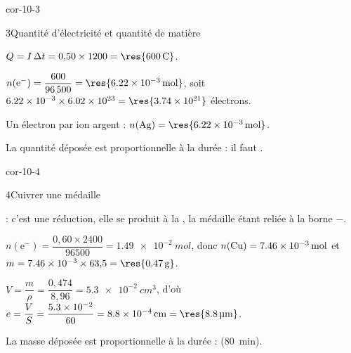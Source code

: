 \begin{blocLivre}{cor-10-3}
\begin{corrige}{3}{Quantité d'électricité et quantité de matière}
\begin{questions}
\item $Q=I\,\Delta t=0{,}50\times1200=\res{\qty{600}{C}}$.
\item $n(\mathrm{e}^-)=\dfrac{600}{\num{96500}}=\res{\qty{6,22e-3}{mol}}$, soit
$\num{6.22e-3}\times\num{6.02e23}=\res{\num{3,74e21}}$ électrons.
\item Un électron par ion argent : $n(\ce{Ag})=\res{\qty{6,22e-3}{mol}}$.
\item La quantité déposée est proportionnelle à la durée : il faut .
\end{questions}
\end{corrige}
\end{blocLivre}
\begin{blocLivre}{cor-10-4}
\begin{corrige}{4}{Cuivrer une médaille}
\begin{questions}
\item {} : c'est une réduction, elle se produit à la , la médaille étant
reliée à la borne $-$.
\item $n(\mathrm{e}^-)=\dfrac{0{,}60\times2400}{\num{96500}}=\qty{1,49e-2}{mol}$, donc
$n(\ce{Cu})=\qty{7,46e-3}{mol}$ et $m=\num{7.46e-3}\times63{,}5=\res{\qty{0,47}{g}}$.
\item $V=\dfrac{m}{\rho}=\dfrac{0{,}474}{8{,}96}=\qty{5,3e-2}{cm^3}$, d'où
$e=\dfrac{V}{S}=\dfrac{\num{5.3e-2}}{60}=\qty{8,8e-4}{cm}=\res{\qty{8,8}{\micro m}}$.
\item La masse déposée est proportionnelle à la durée :  (80~min).
\end{questions}
\end{corrige}
\end{blocLivre}
